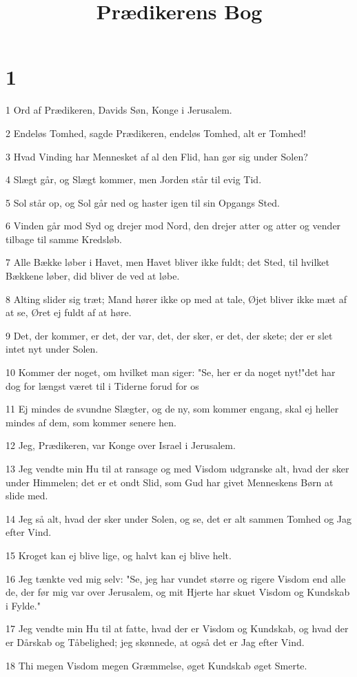 

\title{Prædikerens Bog}


\chapter{1}

\par 1 Ord af Prædikeren, Davids Søn, Konge i Jerusalem.
\par 2 Endeløs Tomhed, sagde Prædikeren, endeløs Tomhed, alt er Tomhed!
\par 3 Hvad Vinding har Mennesket af al den Flid, han gør sig under Solen?
\par 4 Slægt går, og Slægt kommer, men Jorden står til evig Tid.
\par 5 Sol står op, og Sol går ned og haster igen til sin Opgangs Sted.
\par 6 Vinden går mod Syd og drejer mod Nord, den drejer atter og atter og vender tilbage til samme Kredsløb.
\par 7 Alle Bække løber i Havet, men Havet bliver ikke fuldt; det Sted, til hvilket Bækkene løber, did bliver de ved at løbe.
\par 8 Alting slider sig træt; Mand hører ikke op med at tale, Øjet bliver ikke mæt af at se, Øret ej fuldt af at høre.
\par 9 Det, der kommer, er det, der var, det, der sker, er det, der skete; der er slet intet nyt under Solen.
\par 10 Kommer der noget, om hvilket man siger: "Se, her er da noget nyt!"det har dog for længst været til i Tiderne forud for os
\par 11 Ej mindes de svundne Slægter, og de ny, som kommer engang, skal ej heller mindes af dem, som kommer senere hen.
\par 12 Jeg, Prædikeren, var Konge over Israel i Jerusalem.
\par 13 Jeg vendte min Hu til at ransage og med Visdom udgranske alt, hvad der sker under Himmelen; det er et ondt Slid, som Gud har givet Menneskens Børn at slide med.
\par 14 Jeg så alt, hvad der sker under Solen, og se, det er alt sammen Tomhed og Jag efter Vind.
\par 15 Kroget kan ej blive lige, og halvt kan ej blive helt.
\par 16 Jeg tænkte ved mig selv: "Se, jeg har vundet større og rigere Visdom end alle de, der før mig var over Jerusalem, og mit Hjerte har skuet Visdom og Kundskab i Fylde."
\par 17 Jeg vendte min Hu til at fatte, hvad der er Visdom og Kundskab, og hvad der er Dårskab og Tåbelighed; jeg skønnede, at også det er Jag efter Vind.
\par 18 Thi megen Visdom megen Græmmelse, øget Kundskab øget Smerte.

